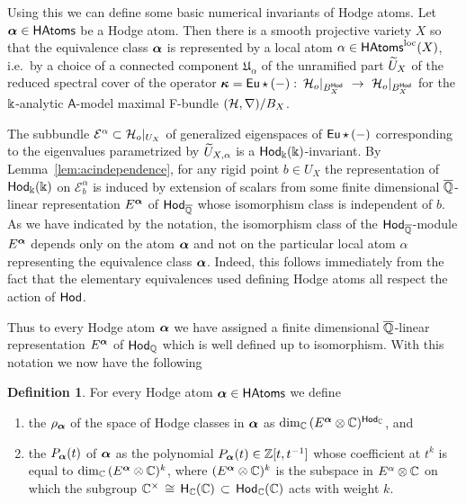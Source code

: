 \documentclass[twoside,leqno]{article}
\numberwithin{equation}{section}
\theoremstyle{plain}
\theoremstyle{definition}
\newtheorem{definition}[equation]{Definition}
\begin{document}
Using this we can define some basic numerical invariants of Hodge atoms. Let $\boldsymbol{\alpha} \in \mathsf{HAtoms}$ be a Hodge atom. Then there is a smooth projective variety $X$ so that  the equivalence class $\boldsymbol{\alpha}$ is represented by a local atom $\alpha \in \mathsf{HAtoms}^{\operatorname{loc}}(X)$, i.e.\ by a choice of a connected component $\mathfrak{U}_{\alpha}$ of  the unramified part $\widetilde U_{X}$ of the reduced spectral cover 
of the operator $\boldsymbol{\kappa} = \operatorname{\mathsf{Eu}}\star \, (-) \, \colon \, \mathcal H_{o}|_{B^{\mathsf{Hod}}_{X}} \ \to \ \mathcal H_{o}|_{B^{\mathsf{Hod}}_{X}}$
for the $\Bbbk$-analytic $\mathsf{A}$-model maximal F-bundle $(\mathcal H,\nabla)/B_{X}$. 

The subbundle $\mathcal{E}^{\alpha} \subset \mathcal H_{o}|_{U_{X}}$ of generalized eigenspaces of $\operatorname{\mathsf{Eu}}\star \, (-)$ corresponding to the eigenvalues parametrized by 
$\widetilde U_{X,\alpha}$ is a $\mathsf{Hod}_{\Bbbk}(\Bbbk)$-invariant. By Lemma~\ref{lem:acindependence}, for any rigid point $b \in U_{X}$ the representation of $\mathsf{Hod}_{\Bbbk}(\Bbbk)$ on $\mathcal{E}^{\alpha}_{b}$ is induced by extension of scalars from some finite dimensional $\overline{\mathbb Q}$-linear representation $E^{\boldsymbol{\alpha}}$ of $\mathsf{Hod}_{\overline{\mathbb Q}}$ whose isomorphism class is independent of $b$. As we have indicated by the notation, the isomorphism class of the $\mathsf{Hod}_{\overline{\mathbb Q}}$-module $E^{\boldsymbol{\alpha}}$ depends only on the atom $\boldsymbol{\alpha}$ and not on the particular local atom $\alpha$ representing the equivalence class $\boldsymbol{\alpha}$. Indeed, this  follows immediately from the fact that the elementary  equivalences used  defining Hodge atoms all respect the action of $\mathsf{Hod}$. 

\medskip

Thus to every Hodge atom $\boldsymbol{\alpha}$  we have assigned  a finite dimensional $\overline{\mathbb Q}$-linear representation $E^{\boldsymbol{\alpha}}$ of $\mathsf{Hod}_{\mathbb Q}$ which is well defined up to isomorphism.
With this notation we now have the following

\begin{definition} \label{def:numinv} For every Hodge atom $\boldsymbol{\alpha} \in \mathsf{HAtoms}$ we define
\begin{enumerate}[wide]
\item the  $\rho_{\boldsymbol{\alpha}}$ of the space of Hodge classes in $\boldsymbol{\alpha}$  as 
$\dim_{\mathbb C} \, (E^{\boldsymbol{\alpha}}\otimes \mathbb C)^{\mathsf{Hod}_{\mathbb C}}$, and
\item the  $P_{\boldsymbol{\alpha}}(t)$ of $\boldsymbol{\alpha}$ as the polynomial $P_{\boldsymbol{\alpha}}(t) \in \mathbb Z[t,t^{-1}]$ whose coefficient at $t^{k}$ is equal to 
$\dim_{\mathbb C} \, (E^{\boldsymbol{\alpha}}\otimes \mathbb C)^{k}$, where $(E^{\boldsymbol{\alpha}}\otimes \mathbb C)^{k}$ is the subspace in $E^{\alpha}\otimes \mathbb C$ on which the subgroup $\mathbb C^{\times} \, \cong \, \mathsf{H}_{\mathbb C}(\mathbb C) \, \subset \,  \mathsf{Hod}_{\mathbb C}(\mathbb C)$ acts with weight $k$.
\end{enumerate}
\end{definition}
\end{document}
